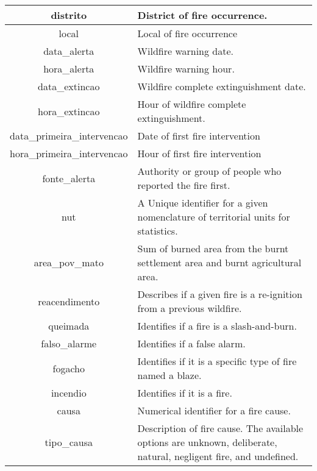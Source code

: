 \begin{table}[h!]
\begin{tabular}{|c|p{7.5cm}|}
distrito  & District of fire occurrence. \\
\hline


local  & Local of fire occurrence \\
\hline


data\_alerta  & Wildfire warning date. \\
\hline
hora\_alerta  & Wildfire warning hour. \\
\hline
data\_extincao & Wildfire complete extinguishment date. \\
\hline
hora\_extincao & Hour of wildfire complete extinguishment. \\
\hline
data\_primeira\_intervencao & Date of first fire intervention \\
\hline
hora\_primeira\_intervencao & Hour of first fire intervention \\
\hline
fonte\_alerta & Authority or group of people who reported the fire first. \\
\hline
nut & A Unique identifier for a given nomenclature of territorial units for statistics. \\
\hline



area\_pov\_mato & Sum of burned area from the burnt settlement area and burnt agricultural area.\\
\hline

reacendimento & Describes if a given fire is a re-ignition from a previous wildfire. \\
\hline
queimada & Identifies if a fire is a slash-and-burn. \\
\hline
falso\_alarme & Identifies if a false alarm. \\
\hline
fogacho & Identifies if it is a specific type of fire named a blaze. \\
\hline
incendio & Identifies if it is a fire. \\
\hline
causa & Numerical identifier for a fire cause. \\
\hline
tipo\_causa & Description of fire cause. The available options are unknown, deliberate, natural, negligent fire, and undefined. \\
\hline
\end{tabular}
\end{table}




